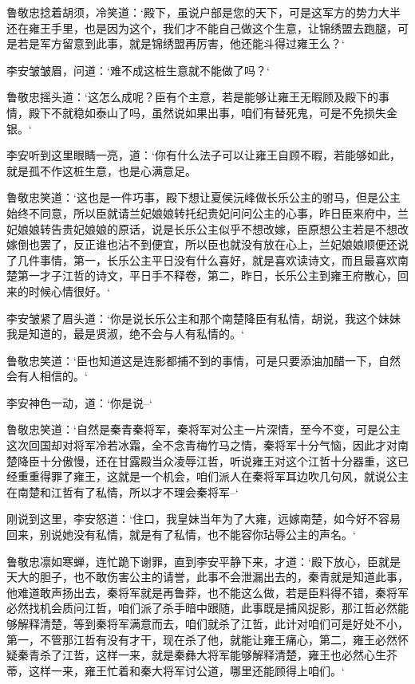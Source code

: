鲁敬忠捻着胡须，冷笑道：‘殿下，虽说户部是您的天下，可是这军方的势力大半还在雍王手里，也是因为这个，我们才不能自己做这个生意，让锦绣盟去跑腿，可是若是军方留意到此事，就是锦绣盟再厉害，他还能斗得过雍王么？‘

李安皱皱眉，问道：‘难不成这桩生意就不能做了吗？‘

鲁敬忠摇头道：‘这怎么成呢？臣有个主意，若是能够让雍王无暇顾及殿下的事情，殿下不就稳如泰山了吗，虽然说如果出事，咱们有替死鬼，可是不免损失金银。‘

李安听到这里眼睛一亮，道：‘你有什么法子可以让雍王自顾不暇，若能够如此，就是孤不作这桩生意，也是心满意足。

鲁敬忠笑道：‘这也是一件巧事，殿下想让夏侯沅峰做长乐公主的驸马，但是公主始终不同意，所以臣就请兰妃娘娘转托纪贵妃问问公主的心事，昨日臣来府中，兰妃娘娘转告贵妃娘娘的原话，说是长乐公主似乎不想改嫁，臣原想公主若是不想改嫁倒也罢了，反正谁也沾不到便宜，所以臣也就没有放在心上，兰妃娘娘顺便还说了几件事情，第一，长乐公主平日没有什么喜好，就是喜欢读诗文，而且最喜欢南楚第一才子江哲的诗文，平日手不释卷，第二，昨日，长乐公主到雍王府散心，回来的时候心情很好。‘

李安皱紧了眉头道：‘你是说长乐公主和那个南楚降臣有私情，胡说，我这个妹妹我是知道的，最是贤淑，绝不会与人有私情的。‘

鲁敬忠笑道：‘臣也知道这是连影都捕不到的事情，可是只要添油加醋一下，自然会有人相信的。‘

李安神色一动，道：‘你是说--‘

鲁敬忠笑道：‘自然是秦青秦将军，秦将军对公主一片深情，至今不变，可是公主这次回国却对将军冷若冰霜，全不念青梅竹马之情，秦将军十分气恼，因此才对南楚降臣十分傲慢，还在甘露殿当众凌辱江哲，听说雍王对这个江哲十分器重，这已经重重得罪了雍王，这就是一个机会，咱们派人在秦将军耳边吹几句风，就说公主在南楚和江哲有了私情，所以才不理会秦将军--‘

刚说到这里，李安怒道：‘住口，我皇妹当年为了大雍，远嫁南楚，如今好不容易回来，别说她没有私情，就是有了私情，也不能容你玷辱公主的声名。‘

鲁敬忠凛如寒蝉，连忙跪下谢罪，直到李安平静下来，才道：‘殿下放心，臣就是天大的胆子，也不敢伤害公主的请誉，此事不会泄漏出去的，秦青就是知道此事，他难道敢声扬出去，秦将军就是再鲁莽，也不能这么做，若是臣料得不错，秦将军必然找机会质问江哲，咱们派了杀手暗中跟随，此事既是捕风捉影，那江哲必然能够解释清楚，等到秦将军满意而去，咱们就杀了江哲，此计对咱们可是好处不小，第一，不管那江哲有没有才干，现在杀了他，就能让雍王痛心，第二，雍王必然怀疑秦青杀了江哲，这样一来，就是秦彝大将军能够解释清楚，雍王也必然心生芥蒂，这样一来，雍王忙着和秦大将军讨公道，哪里还能顾得上咱们。‘


